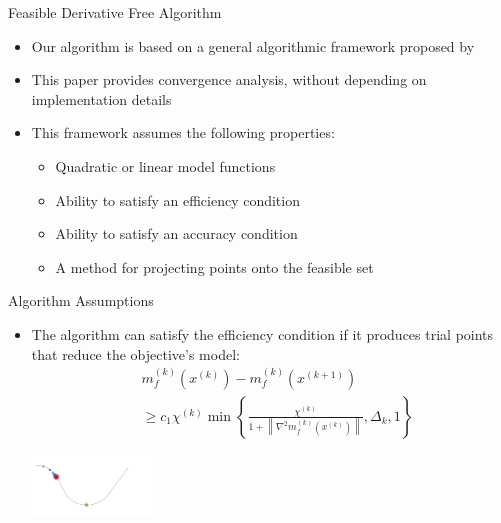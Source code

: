 \documentclass{beamer}
\newcommand{\xk}{{{x}^{(k)}}}
\begin{document}
\begin{frame}{Feasible Derivative Free Algorithm}
	\begin{itemize}
		\setlength\itemsep{1.2em}
		\item Our algorithm is based on a general algorithmic framework proposed by \cite{CONEJO2013324}
		\item This paper provides convergence analysis, without depending on implementation details
		\item This framework assumes the following properties:
			\begin{itemize}
				\item Quadratic or linear model functions
				\item Ability to satisfy an efficiency condition
				\item Ability to satisfy an accuracy condition
				\item A method for projecting points onto the feasible set
			\end{itemize}
	\end{itemize}
\end{frame}




\begin{frame}{Algorithm Assumptions}
	\begin{itemize}
		\item The algorithm can satisfy the efficiency condition if it produces trial points that reduce the objective's model:
		\begin{align*}
			& m_f^{(k)}\left(\xk\right) - m_f^{(k)}\left(x^{(k+1)}\right) \\
			& \ge c_1 \chi^{(k)} \min \left\{
				\frac{\chi^{(k)}}{1 + \left\|\nabla^2 m_f^{(k)}\left(x^{(k)}\right)\right\|},
				\Delta_k, 1\right\}
		\end{align*}

		\begin{center}
			\includegraphics[width=120px]{images/sufficient_reduction.png}
		\end{center}
	\end{itemize}
\end{frame}
\end{document}
